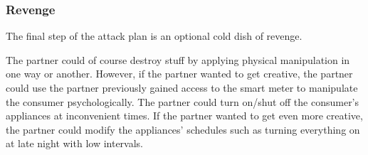 \subsubsection{Revenge}
The final step of the attack plan is an optional cold dish of revenge.

The partner could of course destroy stuff by applying physical manipulation in one way or another.
However, if the partner wanted to get creative, the partner could use the partner previously gained access to the smart meter to manipulate the consumer psychologically.
The partner could turn on/shut off the consumer's appliances at inconvenient times.
If the partner wanted to get even more creative, the partner could modify the appliances' schedules such as turning everything on at late night with low intervals.
